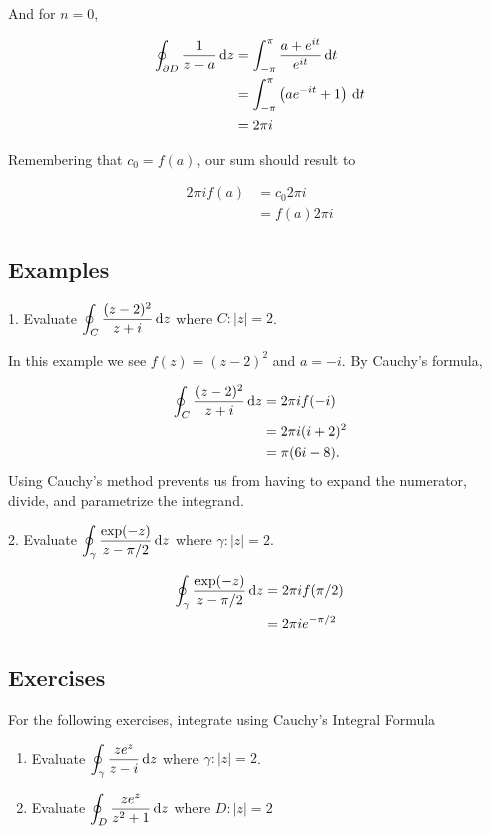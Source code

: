 \noindent And for $n=0$,

\begin{align*}
    \oint_{\partial D} \frac{1}{z-a}\,\textrm{d}z &= \int_{-\pi}^{\pi} \frac{a+e^{it}}{e^{it}}\,\textrm{d}t \\
    &= \int_{-\pi}^{\pi}\left( ae^{-it} + 1\right)\,\textrm{d}t \\
    &= 2\pi i
\end{align*}

\noindent Remembering that $c_0 = f(a)$, our sum should result to 

\begin{align*}
    2\pi i f(a) &= c_0 2\pi i \\
    &= f(a) 2 \pi i
\end{align*}

\subsection*{Examples}

1. Evaluate $\displaystyle \oint_C \frac{(z-2)^2}{z+i}\,\textrm{d}z$ where $C : |z|=2$.
\begin{ExampleBody}
In this example we see $f(z)=(z-2)^2$ and $a=-i$. By Cauchy's formula,

\begin{align*} 
\oint_C \frac{(z-2)^2}{z+i}\,\textrm{d}z &= 2\pi if(-i) \\
&= 2\pi i (i+2)^2 \\
&= \pi(6i-8).
\end{align*}
Using Cauchy's method prevents us from having to expand the numerator, divide, and parametrize the integrand.
\end{ExampleBody}

2. Evaluate $\displaystyle \oint_\gamma \frac{\exp(-z)}{z-\pi/2}\,\textrm{d}z$ where $\gamma: |z|=2$.
\begin{ExampleBody}
\begin{align*}
    \oint_\gamma \frac{\exp(-z)}{z-\pi/2}\,\textrm{d}z &= 2\pi i f(\pi/2) \\
    &= 2\pi i e^{-\pi/2}
\end{align*}

\end{ExampleBody}


\subsection*{Exercises}
For the following exercises, integrate using Cauchy's Integral Formula

\begin{enumerate}
    \item Evaluate $\displaystyle \oint_\gamma \frac{ze^z}{z-i}\, \textrm{d}z$ where $\gamma : |z|=2$.
    \item Evaluate $\displaystyle \oint_D \frac{ze^z}{z^2+1}\,\textrm{d}z$ where $D : |z| = 2$
\end{enumerate}



